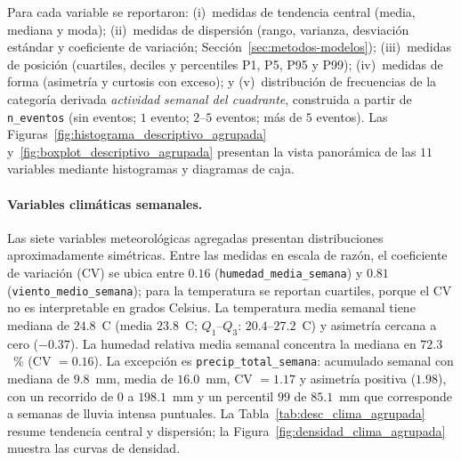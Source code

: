     Para cada variable se reportaron: (i)~medidas de tendencia central (media, mediana y moda); (ii)~medidas de dispersión (rango, varianza, desviación estándar y coeficiente de variación; Sección~\ref{sec:metodos-modelos}); (iii)~medidas de posición (cuartiles, deciles y percentiles P1, P5, P95 y P99); (iv)~medidas de forma (asimetría y curtosis con exceso); y (v)~distribución de frecuencias de la categoría derivada \emph{actividad semanal del cuadrante}, construida a partir de \texttt{n\_eventos} (sin eventos; $1$ evento; $2$--$5$ eventos; más de $5$ eventos). Las Figuras~\ref{fig:histograma_descriptivo_agrupada} y~\ref{fig:boxplot_descriptivo_agrupada} presentan la vista panorámica de las $11$ variables mediante histogramas y diagramas de caja.
    
    
    
    \paragraph{Variables climáticas semanales.} Las siete variables meteorológicas agregadas presentan distribuciones aproximadamente simétricas. Entre las medidas en escala de razón, el coeficiente de variación (CV) se ubica entre $0{.}16$ (\texttt{humedad\_media\_semana}) y $0{.}81$ (\texttt{viento\_medio\_semana}); para la temperatura se reportan cuartiles, porque el CV no es interpretable en grados Celsius. La temperatura media semanal tiene mediana de $24{.}8$~\textdegree C (media $23{.}8$~\textdegree C; $Q_1$--$Q_3$: $20{.}4$--$27{.}2$~\textdegree C) y asimetría cercana a cero ($-0{.}37$). La humedad relativa media semanal concentra la mediana en $72{.}3$~\% (CV $= 0{.}16$). La excepción es \texttt{precip\_total\_semana}: acumulado semanal con mediana de $9{.}8$~mm, media de $16{.}0$~mm, CV $= 1{.}17$ y asimetría positiva ($1{.}98$), con un recorrido de $0$ a $198{.}1$~mm y un percentil $99$ de $85{.}1$~mm que corresponde a semanas de lluvia intensa puntuales. La Tabla~\ref{tab:desc_clima_agrupada} resume tendencia central y dispersión; la Figura~\ref{fig:densidad_clima_agrupada} muestra las curvas de densidad.
    
